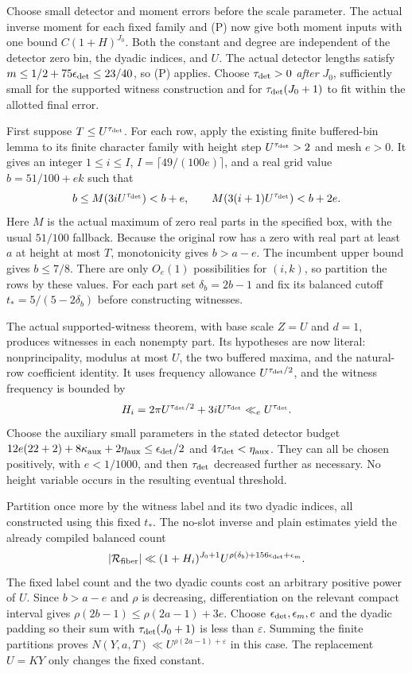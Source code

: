 Choose small detector and moment errors before the scale parameter. The
actual inverse moment for each fixed  family and (P)
now give both moment inputs with one bound $C(1+H)^{J_0}$. Both the constant
and degree are independent of the detector zero bin, the dyadic indices,
and $U$. The actual detector lengths satisfy
$m\le1/2+75\epsilon_{\rm det}\le23/40$, so (P) applies.
Choose $\tau_{\rm det}>0$ \emph{after} $J_0$, sufficiently small for the supported
witness construction and for
$\tau_{\rm det}(J_0+1)$ to fit within the allotted final error.

First suppose $T\le U^{\tau_{\rm det}}$. For each row, apply the existing finite
buffered-bin lemma to its finite character family with height step
$U^{\tau_{\rm det}}>2$ and mesh $e>0$. It gives an integer $1\le i\le I$,
$I=\lceil49/(100e)\rceil$, and a real grid value $b=51/100+ek$ such that
\[
 b\le M(3iU^{\tau_{\rm det}})<b+e,
 \qquad M(3(i+1)U^{\tau_{\rm det}})<b+2e.
\]
Here $M$ is the actual maximum of zero real parts in the specified box,
with the usual $51/100$ fallback. Because the original row has a zero
with real part at least $a$ at height at most $T$, monotonicity gives
$b>a-e$. The incumbent upper bound gives $b\le7/8$. There are only
$O_e(1)$ possibilities for $(i,k)$, so partition the rows by these values.
For each part set $\delta_b=2b-1$ and fix its balanced cutoff
$t_*=5/(5-2\delta_b)$ before constructing witnesses.

The actual supported-witness theorem, with base scale $Z=U$ and $d=1$,
produces witnesses in each nonempty part. Its hypotheses are now literal:
nonprincipality, modulus at most $U$, the two buffered maxima, and the
natural-row coefficient identity. It uses frequency allowance
$U^{\tau_{\rm det}/2}$, and the witness frequency is bounded by
\[
 H_i=2\pi U^{\tau_{\rm det}/2}+3iU^{\tau_{\rm det}}\ll_e U^{\tau_{\rm det}}.
\]
Choose the auxiliary small parameters in the stated detector budget
$12e(22+2)+8\kappa_{\rm aux}+2\eta_{\rm aux}
 \le\epsilon_{\rm det}/2$ and
$4\tau_{\rm det}<\eta_{\rm aux}$. They can all be chosen positively, with
$e<1/1000$, and then $\tau_{\rm det}$ decreased further as necessary. No height
variable occurs in the resulting eventual threshold.

Partition once more by the witness label and its two dyadic indices, all
constructed using this fixed $t_*$. The no-slot inverse and plain estimates yield the
already compiled balanced count
\[
 |\mathcal R_{\rm fiber}|
 \ll (1+H_i)^{J_0+1}
 U^{\rho(\delta_b)+156\epsilon_{\rm det}+\epsilon_m}.
\]
The fixed label count and the two dyadic counts cost an arbitrary positive
power of $U$. Since $b>a-e$ and $\rho$ is decreasing, differentiation on
the relevant compact interval gives
$\rho(2b-1)\le\rho(2a-1)+3e$.
Choose $\epsilon_{\rm det},\epsilon_m,e$ and the dyadic padding so their
sum with $\tau_{\rm det}(J_0+1)$ is less than $\varepsilon$. Summing the finite
partitions proves $N(Y,a,T)\ll U^{\rho(2a-1)+\varepsilon}$ in this case.
The replacement $U=KY$ only changes the fixed constant.

